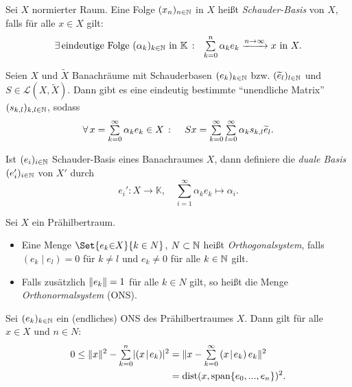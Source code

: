 \documentclass{cheat-sheet}
\newcommand{\K}{\mathbb{K}}
\newcommand{\LSO}{\mathcal{L}} %
\newcommand{\dist}{\mathrm{dist}} %
\newcommand{\scp}[2]{\left( #1 \!\mid\! #2 \right)} %
\newcommand{\convWith}[1]{\xrightarrow{#1 \to \infty}} %
\begin{document}

\begin{definition}
  Sei $X$ normierter Raum. Eine Folge $(x_n)_{n \in \mathbb{N}}$ in $X$ heißt \emph{Schauder-Basis} von $X$, falls für alle $x \in X$ gilt:
  \[
    \ex{\text{eindeutige Folge $(\alpha_k)_{k \in \N}$ in $\K$}} \enspace
    \sum_{k=0}^n \alpha_k e_k \convWith{n} x \text{ in } X.
  \]
\end{definition}

\begin{bem}
  Seien $X$ und $\widetilde{X}$ Banachräume mit Schauderbasen $(e_k)_{k \in \mathbb{N}}$ bzw. $(\widetilde{e}_l)_{l \in \mathbb{N}}$ und $S \in \LSO(X, \widetilde{X})$. Dann gibt es eine eindeutig bestimmte "`unendliche Matrix"' $(s_{k,l})_{k,l \in \mathbb{N}}$, sodass
  \[
    \fa{x = \sum_{k=0}^\infty \alpha_k e_k \in X}
    \quad
    Sx = \sum_{k=0}^\infty \sum_{l=0}^\infty \alpha_k s_{k,l} \widetilde{e}_l.
  \]
\end{bem}

\begin{defn}
  Ist $(e_i)_{i \in \mathbb{N}}$ Schauder-Basis eines Banachraumes $X$, dann definiere die \emph{duale Basis} $(e_i')_{i \in \mathbb{N}}$ von $X'$ durch
  \[ e_i' : X \to \K, \quad \sum_{i=1}^\infty \alpha_k e_k \mapsto \alpha_i. \]
\end{defn}


\begin{defn}
  Sei $X$ ein Prähilbertraum.
  \begin{itemize}
    \item Eine Menge $\Set{ e_k {\in} X }{ k \in N }$, $N \subset \mathbb{N}$ heißt \emph{Orthogonalsystem}, falls $\scp{e_k}{e_l} = 0$ für $k \not= l$ und $e_k \not= 0$ für alle $k \in \mathbb{N}$ gilt.
    \item Falls zusätzlich $\lVert e_k\rVert = 1$ für alle $k \in N$ gilt, so heißt die Menge \emph{Orthonormalsystem} (ONS).
  \end{itemize}
\end{defn}

\begin{lem}
  Sei $(e_k)_{k \in \mathbb{N}}$ ein (endliches) ONS des Prähilbertraumes $X$. Dann gilt für alle $x \in X$ und $n \in N$:
  \begin{align*}
    0 \leq \norm{x}^2 - \sum_{k=0}^n \abs{\scp{x}{e_k}}^2 &= \norm{x - \sum_{k=0}^\infty \scp{x}{e_k} e_k}^2\\
    &= \dist(x, \mathrm{span} \{ e_0, ..., e_n \})^2.
  \end{align*}
\end{lem}
\end{document}
